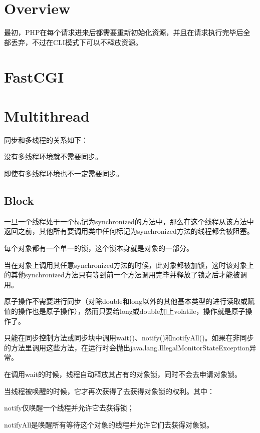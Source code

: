 \section{Overview}

最初，PHP在每个请求进来后都需要重新初始化资源，并且在请求执行完毕后全部丢弃，不过在CLI模式下可以不释放资源。



\section{FastCGI}



\section{Multithread}

同步和多线程的关系如下：

\begin{compactenum}
\item 没有多线程环境就不需要同步。
\item 即使有多线程环境也不一定需要同步。 
\end{compactenum}




\subsection{Block}


一旦一个线程处于一个标记为synchronized的方法中，那么在这个线程从该方法中返回之前，其他所有要调用类中任何标记为synchronized方法的线程都会被阻塞。  




每个对象都有一个单一的锁，这个锁本身就是对象的一部分。

当在对象上调用其任意synchronized方法的时候，此对象都被加锁，这时该对象上的其他synchronized方法只有等到前一个方法调用完毕并释放了锁之后才能被调用。

原子操作不需要进行同步（对除double和long以外的其他基本类型的进行读取或赋值的操作也是原子操作），然而只要给long或double加上volatile，操作就是原子操作了。

只能在同步控制方法或同步块中调用wait()、notify()和notifyAll()。如果在非同步的方法里调用这些方法，在运行时会抛出java.lang.IllegalMonitorStateException异常。 

\begin{compactitem}
\item  在调用wait的时候，线程自动释放其占有的对象锁，同时不会去申请对象锁。
\item 当线程被唤醒的时候，它才再次获得了去获得对象锁的权利。其中：

\begin{compactenum}
\item notify仅唤醒一个线程并允许它去获得锁；
\item notifyAll是唤醒所有等待这个对象的线程并允许它们去获得对象锁。
\end{compactenum}

\end{compactitem}





